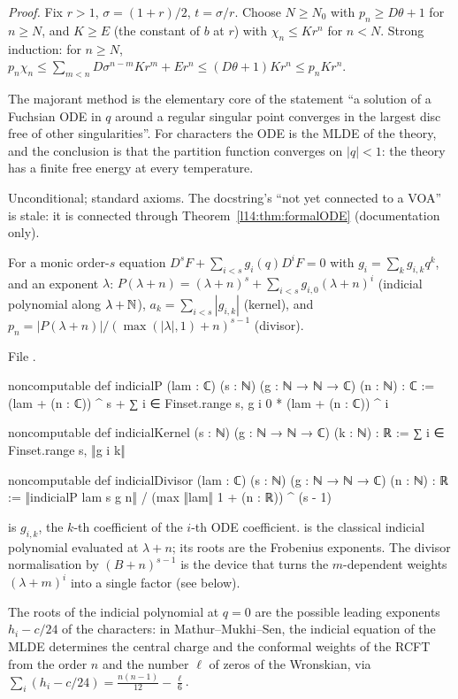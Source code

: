\noindent\emph{Proof.} Fix $r>1$, $\sigma = (1+r)/2$, $t = \sigma/r$. Choose $N\ge N_0$ with $p_n\ge D\theta+1$ for $n\ge N$, and
$K\ge E$ (the constant of $b$ at $r$) with $\chi_n\le Kr^n$ for $n<N$. Strong induction: for $n\ge N$,
$p_n\chi_n\le\sum_{m<n}D\sigma^{n-m}Kr^m + Er^n\le(D\theta+1)Kr^n\le p_nKr^n$.
\begin{physics}
The majorant method is the elementary core of the statement ``a solution of a Fuchsian ODE in $q$ around a regular singular
point converges in the largest disc free of other singularities''. For characters the ODE is the MLDE of the theory, and the
conclusion is that the partition function converges on $|q|<1$: the theory has a finite free energy at every temperature.
\end{physics}
\begin{status}
Unconditional; standard axioms. The docstring's ``not yet connected to a VOA'' is stale: it is connected through
Theorem~\ref{l14:thm:formalODE} (documentation only).
\end{status}

\begin{definition}\label{l14:def:indicial}
For a monic order-$s$ equation $D^sF + \sum_{i<s}g_i(q)D^iF = 0$ with $g_i = \sum_kg_{i,k}q^k$, and an exponent $\lambda$:
$P(\lambda+n) = (\lambda+n)^s + \sum_{i<s}g_{i,0}(\lambda+n)^i$ (indicial polynomial along $\lambda+{\mathbb{N}}$),
$a_k = \sum_{i<s}|g_{i,k}|$ (kernel), and $p_n = |P(\lambda+n)|/(\max(|\lambda|,1)+n)^{s-1}$ (divisor).
\end{definition}
\noindent File .
\begin{leancode}
noncomputable def indicialP (lam : ℂ) (s : ℕ) (g : ℕ → ℕ → ℂ) (n : ℕ) : ℂ :=
  (lam + (n : ℂ)) ^ s + ∑ i ∈ Finset.range s, g i 0 * (lam + (n : ℂ)) ^ i

noncomputable def indicialKernel (s : ℕ) (g : ℕ → ℕ → ℂ) (k : ℕ) : ℝ :=
  ∑ i ∈ Finset.range s, ‖g i k‖

noncomputable def indicialDivisor (lam : ℂ) (s : ℕ) (g : ℕ → ℕ → ℂ) (n : ℕ) : ℝ :=
  ‖indicialP lam s g n‖ / (max ‖lam‖ 1 + (n : ℝ)) ^ (s - 1)
\end{leancode}
\begin{dictionary}
 is $g_{i,k}$, the $k$-th coefficient of the $i$-th ODE coefficient.  is the classical indicial
polynomial evaluated at $\lambda+n$; its roots are the Frobenius exponents. The divisor normalisation by $(B+n)^{s-1}$ is the
device that turns the $m$-dependent weights $(\lambda+m)^i$ into a single factor (see below).
\end{dictionary}
\begin{physics}
The roots of the indicial polynomial at $q=0$ are the possible leading exponents $h_i - c/24$ of the characters: in
Mathur--Mukhi--Sen, the indicial equation of the MLDE determines the central charge and the conformal weights of the RCFT
from the order $n$ and the number $\ell$ of zeros of the Wronskian, via $\sum_i(h_i - c/24) = \frac{n(n-1)}{12} - \frac\ell6$.
\end{physics}

